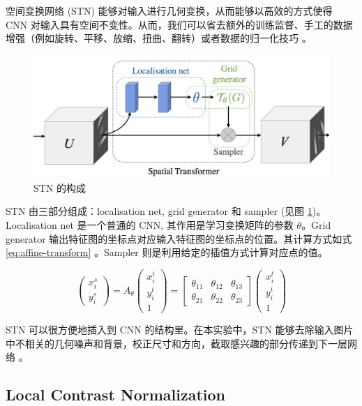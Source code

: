 \documentclass{report}
\begin{document}
空间变换网络 (STN) \cite{STN} 能够对输入进行几何变换，从而能够以高效的方式使得 CNN 对输入具有空间不变性。从而，我们可以省去额外的训练监督、手工的数据增强（例如旋转、平移、放缩、扭曲、翻转）或者数据的归一化技巧 \cite{STN-CNN}。

\begin{figure}[htbp]
  \centering
  \includegraphics[width = 0.6 \textwidth]{STN.png}
  \caption{STN 的构成 \cite{STN}}
  \label{fig:STN}
\end{figure}

STN 由三部分组成：localisation net, grid generator 和 sampler (见图 \ref{fig:STN})。Localisation net 是一个普通的 CNN, 其作用是学习变换矩阵的参数 $\theta$。Grid generator 输出特征图的坐标点对应输入特征图的坐标点的位置。其计算方式如式 \ref{eq:affine-transform} 。Sampler 则是利用给定的插值方式计算对应点的值。

\begin{equation}
\begin{pmatrix}
x_i^s \\ y_i^s
\end{pmatrix} =
A_\theta
\begin{pmatrix}
x_i^t \\ y_i^t \\ 1
\end{pmatrix} =
\begin{bmatrix}
\theta_{11} & \theta_{12} & \theta_{13} \\
\theta_{21} & \theta_{22} & \theta_{23}
\end{bmatrix}
\begin{pmatrix}
x_i^t \\ y_i^t \\ 1
\end{pmatrix}
\label{eq:affine-transform}
\end{equation}

STN 可以很方便地插入到 CNN 的结构里。在本实验中，STN 能够去除输入图片中不相关的几何噪声和背景，校正尺寸和方向，截取感兴趣的部分传递到下一层网络 \cite{STN-CNN}。

\subsection{Local Contrast Normalization}
\end{document}
